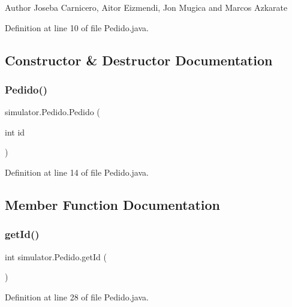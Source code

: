 \begin{DoxyAuthor}{Author}
Joseba Carnicero, Aitor Eizmendi, Jon Mugica and Marcos Azkarate 
\end{DoxyAuthor}


Definition at line 10 of file Pedido.\+java.



\subsection{Constructor \& Destructor Documentation}
\mbox{\label{classsimulator_1_1_pedido_a2587e6c91c06bfd2057039ff2e10874a}} 
\subsubsection{\texorpdfstring{Pedido()}{Pedido()}}
{\footnotesize\ttfamily simulator.\+Pedido.\+Pedido (\begin{DoxyParamCaption}\item[{int}]{id }\end{DoxyParamCaption})}



Definition at line 14 of file Pedido.\+java.



\subsection{Member Function Documentation}
\mbox{\label{classsimulator_1_1_pedido_a22c3691133eaa7c5b467072e2e4c3ed9}} 
\subsubsection{\texorpdfstring{get\+Id()}{getId()}}
{\footnotesize\ttfamily int simulator.\+Pedido.\+get\+Id (\begin{DoxyParamCaption}{ }\end{DoxyParamCaption})}



Definition at line 28 of file Pedido.\+java.

\mbox{\label{classsimulator_1_1_pedido_ae5b5f146669e6f891fc8dc8e58ef8c64}} 
